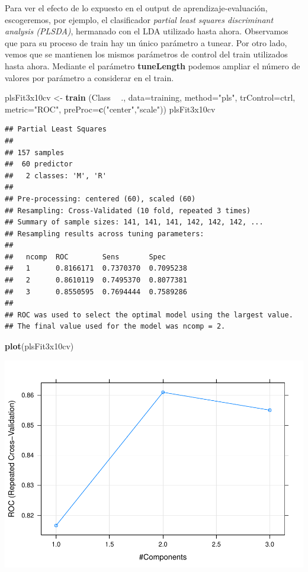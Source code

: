 \documentclass[
]{article}
\newenvironment{Shaded}{\begin{snugshade}}{\end{snugshade}}
\newcommand{\DataTypeTok}[1]{\textcolor[rgb]{0.13,0.29,0.53}{#1}}
\newcommand{\KeywordTok}[1]{\textcolor[rgb]{0.13,0.29,0.53}{\textbf{#1}}}
\newcommand{\NormalTok}[1]{#1}
\newcommand{\OperatorTok}[1]{\textcolor[rgb]{0.81,0.36,0.00}{\textbf{#1}}}
\newcommand{\StringTok}[1]{\textcolor[rgb]{0.31,0.60,0.02}{#1}}
\begin{document}
Para ver el efecto de lo expuesto en el output de
aprendizaje-evaluación, escogeremos, por ejemplo, el clasificador
\emph{partial least squares discriminant analysis (PLSDA)}, hermanado
con el LDA utilizado hasta ahora. Observamos que para su proceso de
train hay un único parámetro a tunear. Por otro lado, vemos que se
mantienen los mismos parámetros de control del train utilizados hasta
ahora. Mediante el parámetro \textbf{tuneLength} podemos ampliar el
número de valores por parámetro a considerar en el train.

\begin{Shaded}
\begin{Highlighting}[]
\NormalTok{plsFit3x10cv <-}\StringTok{ }\KeywordTok{train}\NormalTok{ (Class }\OperatorTok{~}\StringTok{ }\NormalTok{., }\DataTypeTok{data=}\NormalTok{training, }\DataTypeTok{method=}\StringTok{"pls"}\NormalTok{, }\DataTypeTok{trControl=}\NormalTok{ctrl, }
                       \DataTypeTok{metric=}\StringTok{"ROC"}\NormalTok{, }
                       \DataTypeTok{preProc=}\KeywordTok{c}\NormalTok{(}\StringTok{"center"}\NormalTok{,}\StringTok{"scale"}\NormalTok{))}
\NormalTok{plsFit3x10cv}
\end{Highlighting}
\end{Shaded}

\begin{verbatim}
## Partial Least Squares 
## 
## 157 samples
##  60 predictor
##   2 classes: 'M', 'R' 
## 
## Pre-processing: centered (60), scaled (60) 
## Resampling: Cross-Validated (10 fold, repeated 3 times) 
## Summary of sample sizes: 141, 141, 141, 142, 142, 142, ... 
## Resampling results across tuning parameters:
## 
##   ncomp  ROC        Sens       Spec     
##   1      0.8166171  0.7370370  0.7095238
##   2      0.8610119  0.7495370  0.8077381
##   3      0.8550595  0.7694444  0.7589286
## 
## ROC was used to select the optimal model using the largest value.
## The final value used for the model was ncomp = 2.
\end{verbatim}

\begin{Shaded}
\begin{Highlighting}[]
\KeywordTok{plot}\NormalTok{(plsFit3x10cv)}
\end{Highlighting}
\end{Shaded}

\begin{center}\includegraphics[width=0.7\linewidth]{tutorial_files/figure-latex/unnamed-chunk-11-1} \end{center}
\end{document}
